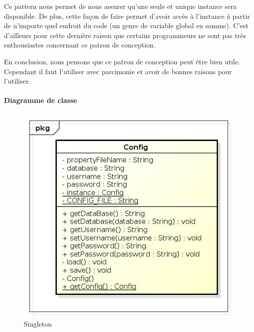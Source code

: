 \documentclass[french,]{article}
\let\oldparagraph\paragraph
\renewcommand{\paragraph}[1]{\oldparagraph{#1}\mbox{}}
\begin{document}
Ce pattern nous permet de nous assurer qu'une seule et unique instance
sera disponible. De plus, cette façon de faire permet d'avoir accès à
l'instance à partir de n'importe quel endroit du code (un genre de
variable global en somme). C'est d'ailleurs pour cette dernière raison
que certains programmeurs ne sont pas très enthousiastes concernant ce
patron de conception.

En conclusion, nous pensons que ce patron de conception peut être bien
utile. Cependant il faut l'utiliser avec parcimonie et avoir de bonnes
raisons pour l'utiliser.

\paragraph{Diagramme de classe}\label{diagramme-de-classe-1}

\begin{figure}
\centering
\includegraphics{singleton.jpg}
\caption{Singleton}
\end{figure}
\end{document}
